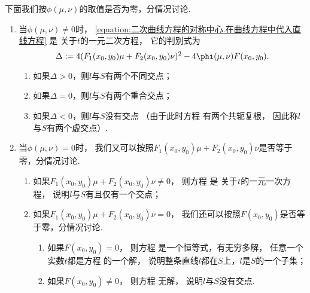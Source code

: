 下面我们按\(\phi(\mu,\nu)\)的取值是否为零，分情况讨论.
\begin{enumerate}
	\item 当\(\phi(\mu,\nu) \neq 0\)时，
	\cref{equation:二次曲线方程的对称中心.在曲线方程中代入直线方程} 是
	关于\(t\)的一元二次方程，
	它的判别式为\begin{equation*}
		\Delta \defeq 4 (F_1(x_0,y_0) \mu + F_2(x_0,y_0) \nu)^2 - 4 \phi(\mu,\nu) F(x_0,y_0).
	\end{equation*}
	\begin{enumerate}
		\item 如果\(\Delta > 0\)，则\(l\)与\(S\)有两个不同交点；

		\item 如果\(\Delta = 0\)，则\(l\)与\(S\)有两个重合交点；

		\item 如果\(\Delta < 0\)，则\(l\)与\(S\)没有交点
		（由于此时方程  有两个共轭复根，
		因此称\(l\)与\(S\)有两个虚交点）.
	\end{enumerate}

	\item 当\(\phi(\mu,\nu) = 0\)时，
	我们又可以按照\(F_1(x_0,y_0) \mu + F_2(x_0,y_0) \nu\)是否等于零，分情况讨论.
	\begin{enumerate}
		\item 如果\(F_1(x_0,y_0) \mu + F_2(x_0,y_0) \nu \neq 0\)，
		则方程  是
		关于\(t\)的一元一次方程，
		说明\(l\)与\(S\)有且仅有一个交点；

		\item 如果\(F_1(x_0,y_0) \mu + F_2(x_0,y_0) \nu = 0\)，
		我们还可以按照\(F(x_0,y_0)\)是否等于零，分情况讨论.
		\begin{enumerate}
			\item 如果\(F(x_0,y_0) = 0\)，
			则方程  是一个恒等式，有无穷多解，
			任意一个实数\(t\)都是方程  的一个解，
			说明整条直线\(l\)都在\(S\)上，\(l\)是\(S\)的一个子集；

			\item 如果\(F(x_0,y_0) \neq 0\)，
			则方程  无解，
			说明\(l\)与\(S\)没有交点.
		\end{enumerate}
	\end{enumerate}
\end{enumerate}

